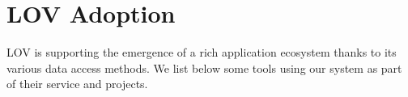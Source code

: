 \documentclass{iosart2c}
\begin{document}
\begin{description}
		
%							
%   
   
\end{description}


\section{LOV Adoption}
\label{sec:lovecosystem}
LOV is supporting the emergence of a rich application ecosystem thanks to its various data access methods. We list below some tools using our system as part of their service and projects.
 
\end{document}
